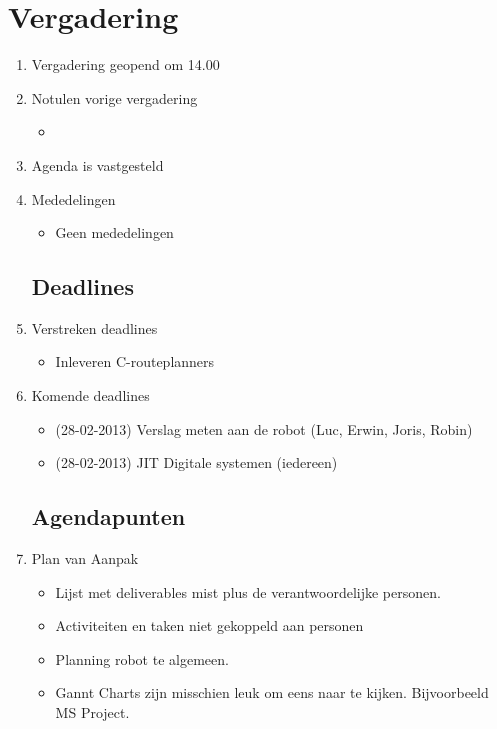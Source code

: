 \documentclass{article}
\begin{document}
\section*{Vergadering}
\begin{enumerate}
	
	\subsection*{Vooraf}
	\item Vergadering geopend om 14.00%
	\item Notulen vorige vergadering
	\begin{itemize}
		\item
	\end{itemize}
	\item Agenda is vastgesteld
	\item Mededelingen
	\begin{itemize}
		\item Geen mededelingen
	\end{itemize}

	\subsection*{Deadlines}
	\item Verstreken deadlines
	\begin{itemize}
		\item Inleveren C-routeplanners
	\end{itemize}
	\item Komende deadlines
	\begin{itemize}
		\item (28-02-2013) Verslag meten aan de robot (Luc, Erwin, Joris, Robin)
		\item (28-02-2013) JIT Digitale systemen (iedereen)
	\end{itemize}

	\subsection*{Agendapunten}

	\item Plan van Aanpak
	\begin{itemize}
		\item Lijst met deliverables mist plus de verantwoordelijke personen.
		\item Activiteiten en taken niet gekoppeld aan personen
		\item Planning robot te algemeen.
		\item Gannt Charts zijn misschien leuk om eens naar te kijken. Bijvoorbeeld MS Project.
	\end{itemize}


\end{enumerate}
\end{document}
